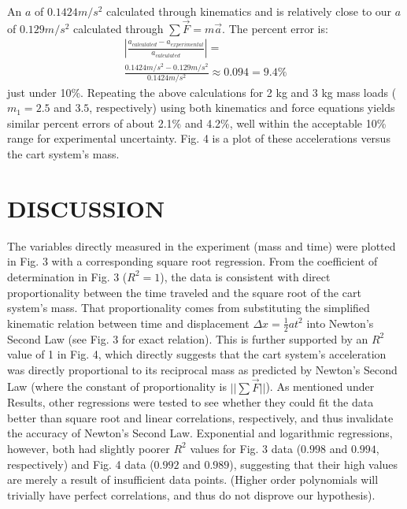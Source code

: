 \documentclass[twocolumn, 10pt]{article}
\begin{document}
An \(a\) of \(0.1424 m/s^2\) calculated through kinematics and is relatively close to our \(a\) of \(0.129 m/s^2\) calculated through \(\sum\vec{F} = m\vec{a}\). The percent error is:
\begin{gather*}
    \left\lvert \frac{a_{calculated}-a_{experimental}}{a_{calculated}} \right\rvert = \tag{8}
    \\\frac{0.1424 m/s^2-0.129m/s^2}{0.1424 m/s^2} \approx 0.094 = 9.4\%
\end{gather*}
just under 10\%. Repeating the above calculations for 2 kg and 3 kg mass loads ($m_1=2.5$ and $3.5$, respectively) using both kinematics and force equations yields similar percent errors of about 2.1\% and 4.2\%, well within the acceptable 10\% range for experimental uncertainty. Fig. 4 is a plot of these accelerations versus the cart system's mass.



\section*{DISCUSSION}
\hspace{\parindent} The variables directly measured in the experiment (mass and time) were plotted in Fig. 3 with a corresponding square root regression. From the coefficient of determination in Fig. 3 ($R^2=1$), the data is consistent with direct proportionality between the time traveled and the square root of the cart system's mass. That proportionality comes from substituting the simplified kinematic relation between time and displacement $\Delta x=\frac{1}{2}at^2$ into Newton's Second Law (see Fig. 3 for exact relation). This is further supported by an $R^2$ value of 1 in Fig. 4, which directly suggests that the cart system's acceleration was directly proportional to its reciprocal mass as predicted by Newton's Second Law (where the constant of proportionality is $||\sum\vec{F}||$). As mentioned under Results, other regressions were tested to see whether they could fit the data better than square root and linear correlations, respectively, and thus invalidate the accuracy of Newton's Second Law. Exponential and logarithmic regressions, however, both had slightly poorer $R^2$ values for Fig. 3 data ($0.998$ and $0.994$, respectively) and Fig. 4 data ($0.992$ and $0.989$), suggesting that their high values are merely a result of insufficient data points. (Higher order polynomials will trivially have perfect correlations, and thus do not disprove our hypothesis).
\end{document}
